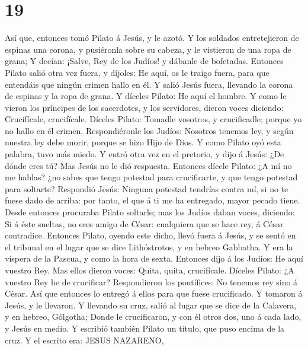 \hypertarget{section-18}{%
\section{19}\label{section-18}}

 Así que, entonces tomó Pilato á Jesús, y le azotó.
 Y los soldados entretejieron de espinas una corona, y
pusiéronla sobre su cabeza, y le vistieron de una ropa de grana;
 Y decían: ¡Salve, Rey de los Judíos! y dábanle de
bofetadas.  Entonces Pilato salió otra vez fuera, y díjoles:
He aquí, os le traigo fuera, para que entendáis que ningún crimen hallo
en él.  Y salió Jesús fuera, llevando la corona de espinas y
la ropa de grana. Y díceles Pilato: He aquí el hombre.  Y
como le vieron los príncipes de los sacerdotes, y los servidores, dieron
voces diciendo: Crucifícale, crucifícale. Díceles Pilato: Tomadle
vosotros, y crucificadle; porque yo no hallo en él crimen. 
Respondiéronle los Judíos: Nosotros tenemos ley, y según nuestra ley
debe morir, porque se hizo Hijo de Dios.  Y como Pilato oyó
esta palabra, tuvo más miedo.  Y entró otra vez en el
pretorio, y dijo á Jesús: ¿De dónde eres tú? Mas Jesús no le dió
respuesta.  Entonces dícele Pilato: ¿A mí no me hablas? ¿no
sabes que tengo potestad para crucificarte, y que tengo potestad para
soltarte?  Respondió Jesús: Ninguna potestad tendrías
contra mí, si no te fuese dado de arriba: por tanto, el que á ti me ha
entregado, mayor pecado tiene.  Desde entonces procuraba
Pilato soltarle; mas los Judíos daban voces, diciendo: Si á éste
sueltas, no eres amigo de César: cualquiera que se hace rey, á César
contradice.  Entonces Pilato, oyendo este dicho, llevó
fuera á Jesús, y se sentó en el tribunal en el lugar que se dice
Lithóstrotos, y en hebreo Gabbatha.  Y era la víspera de la
Pascua, y como la hora de sexta. Entonces dijo á los Judíos: He aquí
vuestro Rey.  Mas ellos dieron voces: Quita, quita,
crucifícale. Díceles Pilato: ¿A vuestro Rey he de crucificar?
Respondieron los pontífices: No tenemos rey sino á César. 
Así que entonces lo entregó á ellos para que fuese crucificado. Y
tomaron á Jesús, y le llevaron.  Y llevando su cruz, salió
al lugar que se dice de la Calavera, y en hebreo, Gólgotha;
 Donde le crucificaron, y con él otros dos, uno á cada
lado, y Jesús en medio.  Y escribió también Pilato un
título, que puso encima de la cruz. Y el escrito era: JESUS NAZARENO,
